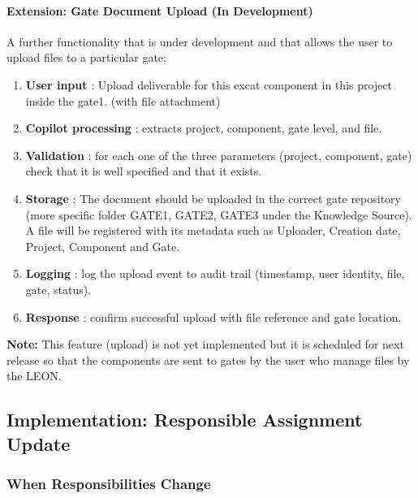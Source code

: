 \paragraph{Extension: Gate Document Upload (In Development)}

A further functionality that is under development and that allows the user to upload files to a particular gate:

\begin{enumerate}
    \item \textcolor[HTML]{003D99}{\textbf{User input}} : Upload deliverable for this excat component in this project inside the gate1. (with file attachment)
    \item \textcolor[HTML]{003D99}{\textbf{Copilot processing}} : extracts project, component, gate level, and file.
    \item \textcolor[HTML]{003D99}{\textbf{Validation}} : for each one of the three parameters (project, component, gate) check that it is well specified and that it exists.
    \item \textcolor[HTML]{003D99}{\textbf{Storage}} : The document should be uploaded in the correct gate repository (more specific folder GATE1, GATE2, GATE3 under the Knowledge Source). A file will be registered with its metadata such as Uploader, Creation date, Project, Component and Gate.
    \item \textcolor[HTML]{003D99}{\textbf{Logging}} : log the upload event to audit trail (timestamp, user identity, file, gate, status).
    \item \textcolor[HTML]{003D99}{\textbf{Response}} : confirm successful upload with file reference and gate location.
\end{enumerate}

\textbf{Note:} This feature (upload) is not yet implemented but it is scheduled for next release so that the components are sent to gates by the user who manage files by the LEON.

\subsection{\textcolor[HTML]{003D99}{Implementation: Responsible Assignment Update}}
\label{sec:impl-responsible-update}

\subsubsection{\textcolor[HTML]{0066CC}{When Responsibilities Change}}

